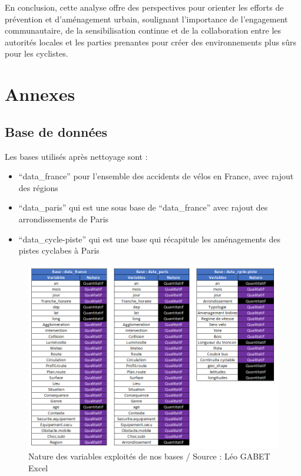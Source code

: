 \documentclass[french,]{compterendu}
\providecommand{\tightlist}{%
  \setlength{\itemsep}{0pt}\setlength{\parskip}{0pt}}
\theoremstyle{urcastyle}
\theoremstyle{remark}
\begin{document}
En conclusion, cette analyse offre des perspectives pour orienter les efforts de prévention et d'aménagement urbain, soulignant l'importance de l'engagement communautaire, de la sensibilisation continue et de la collaboration entre les autorités locales et les parties prenantes pour créer des environnements plus sûrs pour les cyclistes.

\newpage

\hypertarget{annexes}{%
\section{Annexes}\label{annexes}}

\hypertarget{base-de-donnuxe9es}{%
\subsection{Base de données}\label{base-de-donnuxe9es}}

Les bases utilisés après nettoyage sont :

\begin{itemize}
\tightlist
\item
  ``data\_france'' pour l'ensemble des accidents de vélos en France, avec rajout des régions
\item
  ``data\_paris'' qui est une sous base de ``data\_france'' avec rajout des arrondissements de Paris
\item
  ``data\_cycle-piste'' qui est une base qui récapitule les aménagements des pistes cyclabes à Paris
\end{itemize}

\begin{figure}
\centering
\includegraphics{../VAR.png}
\caption{Nature des variables exploités de nos bases / Source : Léo GABET Excel}
\end{figure}
\end{document}

